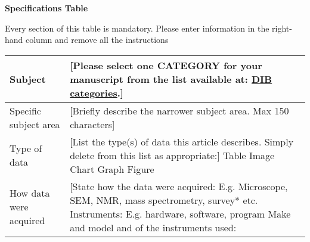 \documentclass[times,final]{elsarticle.cls}
\begin{document}
{\fontsize{7.5pt}{9pt}\selectfont
\noindent\textbf{Specifications Table} 

Every section of this table is mandatory. 
Please enter information in the right-hand column and remove all the instructions
\begin{longtable}{|p{33mm}|p{94mm}|}
\hline
\endhead
\hline
\endfoot
Subject                & [Please select one CATEGORY for your manuscript from the list 
					               available at:\break 
                         \href{https://www.elsevier.com/__data/assets/excel_doc/0012/736977/%
                               DIB-categories.xlsx}{DIB categories}.]\\
\hline                         
Specific subject area  & [Briefly describe the narrower subject area. Max 150 characters]\\
\hline
Type of data           & [List the type(s) of data this article describes. 
                         Simply delete from this list as appropriate:] 
                         Table\newline
                         Image\newline
                         Chart\newline
                         Graph\newline
                         Figure\\             
How data were acquired & [State how the data were acquired: E.g. Microscope,  
                         SEM, NMR, mass spectrometry, survey* etc.\newline
                         Instruments: E.g. hardware, software, program\newline
                         Make and model and of the instruments used:\newline


\end{longtable}}
\end{document}
